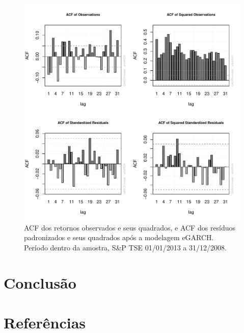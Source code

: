 \documentclass[review]{elsarticle}
\theoremstyle{definition}
\begin{document}
\begin{figure}[H]
	\centering
	\includegraphics[width=0.9\linewidth]{figs/artigo-acf-SP-TSE}
	\caption{ACF dos retornos observados e seus quadrados, e ACF dos resíduos padronizados e seus quadrados após a modelagem eGARCH. Período dentro da amostra, S\&P TSE 01/01/2013 a 31/12/2008.}
	\label{fig:artigo-acf-sptse}
\end{figure}



\section{Conclusão}

\section*{Referências}


\end{document}
